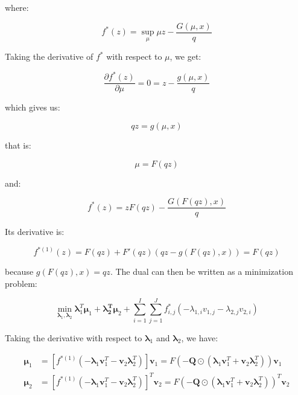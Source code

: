 \documentclass{tex/note}
\begin{document}
where:

\begin{equation*}
f^* \left( z \right) = \sup_{\mu} \mu z - \frac{G \left( \mu , x \right)}{q}
\end{equation*}

Taking the derivative of $f^*$ with respect to $\mu$, we get:

\begin{equation*}
\frac{\partial f^* \left( z \right)}{\partial \mu} = 0 = z - \frac{g \left( \mu , x \right)}{q}
\end{equation*}

which gives us:

\begin{equation*}
q z = g \left( \mu , x \right)
\end{equation*}

that is:

\begin{equation*}
\mu = F \left( q z \right)
\end{equation*}

and:

\begin{equation*}
f^* \left( z \right) = z F \left( q z \right) - \frac{G \left( F \left( q z \right) , x \right)}{q}
\end{equation*}

Its derivative is:

\begin{equation*}
f^{* \left( 1 \right)} \left( z \right) = F \left( q z \right) + F' \left( q z \right) \left( q z - g \left( F \left( q z \right) , x \right) \right) = F \left( q z \right)
\end{equation*}

because $g \left( F \left( qz \right) , x \right) = q z$.  The dual can then be written as a minimization problem:

\begin{equation*}
\min_{\bm{\lambda}_1, \bm{\lambda}_2} \bm{\lambda}_1^T \bm{\mu}_1 + \bm{\lambda_2^T} \bm{\mu}_2 + \sum_{i = 1}^I \sum_{j = 1}^J f_{i,j}^* \left( - \lambda_{1,i} v_{1,j} - \lambda_{2,j} v_{2,i} \right)
\end{equation*}

Taking the derivative with respect to $\bm{\lambda}_1$ and $\bm{\lambda}_2$, we have:

\begin{align*}
\bm{\mu}_1 &= \left[ f^{* \left( 1 \right)} \left( - \bm{\lambda}_1 \bm{v}_1^T - \bm{v}_2 \bm{\lambda}_2^T \right) \right] \bm{v}_1 = F \left( - \bm{Q} \odot \left( \bm{\lambda}_1 \bm{v}_1^T + \bm{v}_2 \bm{\lambda}_2^T \right) \right) \bm{v}_1 \\
\bm{\mu}_2 &= \left[ f^{* \left( 1 \right)} \left( - \bm{\lambda}_1 \bm{v}_1^T - \bm{v}_2 \bm{\lambda}_2^T \right) \right]^T \bm{v}_2 = F \left( - \bm{Q} \odot \left( \bm{\lambda}_1 \bm{v}_1^T + \bm{v}_2 \bm{\lambda}_2^T \right) \right)^T \bm{v}_2
\end{align*}
\end{document}
